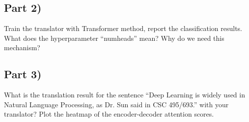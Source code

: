 \documentclass[conference]{IEEEtran}
\begin{document}
\subsection{Part 2)}
\par \noindent Train the translator with Transformer method, report the classification results. What does the hyperparameter “num\textunderscore heads” mean? Why do we need this mechanism?

\subsection{Part 3)}
\par \noindent What is the translation result for the sentence “Deep Learning is widely used in Natural Language Processing, as Dr. Sun said in CSC 495/693.” with your translator? Plot the heatmap of the encoder-decoder attention scores.
\end{document}

